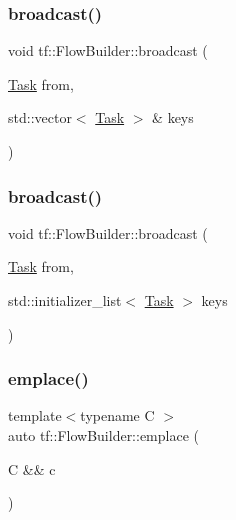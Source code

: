 \mbox{\label{classtf_1_1FlowBuilder_a300450cb88280bf485c6706da5233690}} 
\subsubsection{\texorpdfstring{broadcast()}{broadcast()}\hspace{0.1cm}{\footnotesize\ttfamily [1/2]}}
{\footnotesize\ttfamily void tf\+::\+Flow\+Builder\+::broadcast (\begin{DoxyParamCaption}\item[{\hyperlink{classtf_1_1Task}{Task}}]{from,  }\item[{std\+::vector$<$ \hyperlink{classtf_1_1Task}{Task} $>$ \&}]{keys }\end{DoxyParamCaption})\hspace{0.3cm}{\ttfamily [inline]}}

\mbox{\label{classtf_1_1FlowBuilder_a0472082e25fbc1528cef5ba55f096fc4}} 
\subsubsection{\texorpdfstring{broadcast()}{broadcast()}\hspace{0.1cm}{\footnotesize\ttfamily [2/2]}}
{\footnotesize\ttfamily void tf\+::\+Flow\+Builder\+::broadcast (\begin{DoxyParamCaption}\item[{\hyperlink{classtf_1_1Task}{Task}}]{from,  }\item[{std\+::initializer\+\_\+list$<$ \hyperlink{classtf_1_1Task}{Task} $>$}]{keys }\end{DoxyParamCaption})\hspace{0.3cm}{\ttfamily [inline]}}

\mbox{\label{classtf_1_1FlowBuilder_a6d9c6008100d099994362769d1ea7fbb}} 
\subsubsection{\texorpdfstring{emplace()}{emplace()}\hspace{0.1cm}{\footnotesize\ttfamily [1/3]}}
{\footnotesize\ttfamily template$<$typename C $>$ \\
auto tf\+::\+Flow\+Builder\+::emplace (\begin{DoxyParamCaption}\item[{C \&\&}]{c }\end{DoxyParamCaption})}

